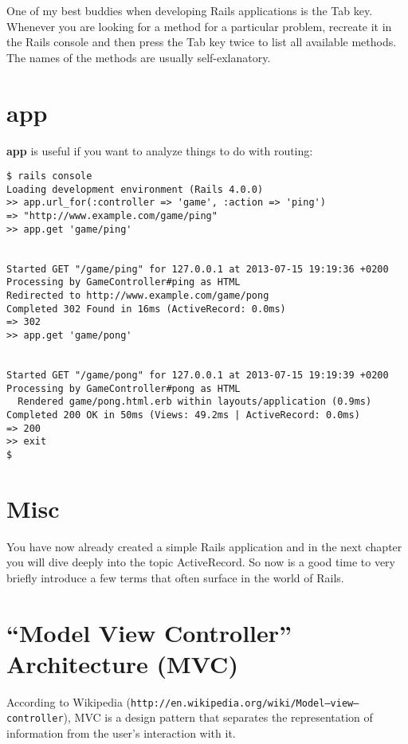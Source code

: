 \documentclass[a4paper]{book}
\begin{document}
One of my best buddies when developing Rails applications is the Tab key. Whenever you are looking for a method for a particular problem, recreate it in the Rails console and then press the Tab key twice to list all available methods. The names of the methods are usually self-exlanatory.

\section{app}\label{app}

\textbf{app} is useful if you want to analyze things to do with routing:

\begin{shaded}\begin{verbatim}
$ rails console
Loading development environment (Rails 4.0.0)
>> app.url_for(:controller => 'game', :action => 'ping')
=> "http://www.example.com/game/ping"
>> app.get 'game/ping'


Started GET "/game/ping" for 127.0.0.1 at 2013-07-15 19:19:36 +0200
Processing by GameController#ping as HTML
Redirected to http://www.example.com/game/pong
Completed 302 Found in 16ms (ActiveRecord: 0.0ms)
=> 302
>> app.get 'game/pong'


Started GET "/game/pong" for 127.0.0.1 at 2013-07-15 19:19:39 +0200
Processing by GameController#pong as HTML
  Rendered game/pong.html.erb within layouts/application (0.9ms)
Completed 200 OK in 50ms (Views: 49.2ms | ActiveRecord: 0.0ms)
=> 200
>> exit
$
\end{verbatim}\end{shaded}

\section{Misc}\label{misc}

You have now already created a simple Rails application and in the next chapter you will dive deeply into the topic ActiveRecord. So now is a good time to very briefly introduce a few terms that often surface in the world of Rails.

\section{“Model View Controller” Architecture (MVC)}\label{model-view-controller-architecture-mvc}

According to Wikipedia (\texttt{http://en.wikipedia.org/wiki/Model–view–controller}), MVC is a design pattern that separates the representation of information from the user's interaction with it.
\end{document}
